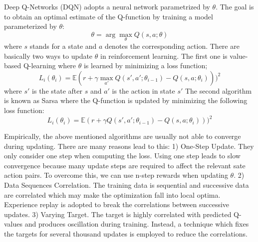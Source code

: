%
Deep Q-Networks (DQN) adopts a neural network parametrized by $\theta$. The goal is to obtain an optimal estimate of the Q-function by training a model parameterized by $\theta$:
\begin{equation*}
\theta = \arg\max_\theta Q(s,a;\theta)
\end{equation*}
where $s$ stands for a state and $a$ denotes the corresponding action.
There are basically two ways to update $\theta$ in reinforcement learning. The first one is value-based Q-learning where $\theta$ is learned by minimizing a loss function;
$$
L_{i}(\theta_{i}) = \mathbb{E}(r+\gamma \max_{a'}Q(s',a';\theta_{i-1})-Q(s,a;\theta_{i})))^2 
$$
where $s'$ is the state after $s$ and $a'$ is the action in state $s'$
The second algorithm is known as Sarsa where the Q-function is updated by minimizing the following loss function:
$$
L_{i}(\theta_{i}) = \mathbb{E}(r+\gamma Q(s',a';\theta_{i-1})-Q(s,a;\theta_{i})))^2 
$$

Empirically, the above mentioned algorithms are usually not able to converge
during updating. There are many reasons lead to this: 1) One-Step Update. They
only consider one step when computing the loss. Using one step leads to slow
convergence because many update steps are required to affect the relevant sate
action pairs. To overcome this, we can use n-step rewards when updating
$\theta$. 2) Data Sequences Correlation. The training data is sequential and
successive data are correlated which may make the optimization fall into local
optima. Experience replay is adopted to break the correlations between
successive updates. 3) Varying Target. The target is highly correlated with
predicted Q-values and produces oscillation during training. Instead, a
technique which fixes the targets for several thousand updates is employed to
reduce the correlations.

